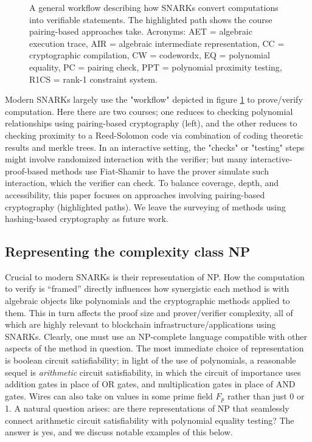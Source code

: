 \begin{figure}[htbp]
    \caption{A general workflow describing how SNARKs convert computations into verifiable statements. The highlighted path shows the course pairing-based approaches take. Acronyms: AET = algebraic execution trace, AIR = algebraic intermediate representation, CC = cryptographic compilation, CW = codewordx, EQ = polynomial equality, PC = pairing check, PPT = polynomial proximity testing, R1CS = rank-1 constraint system.}
    \label{fig:snark-workflow}
\end{figure}
Modern SNARKs largely use the "workflow" depicted in figure \ref{fig:snark-workflow} to prove/verify computation. Here there are two courses; one reduces to checking polynomial relationships using pairing-based cryptography (left), and the other reduces to checking proximity to a Reed-Solomon code via combination of coding theoretic results and merkle trees. In an interactive setting, the "checks" or "testing" steps might involve randomized interaction with the verifier; but many interactive-proof-based methods use Fiat-Shamir to have the prover simulate such interaction, which the verifier can check. To balance coverage, depth, and accessibility, this paper focuses on approaches involving pairing-based cryptography (highlighted paths). We leave the surveying of methods using hashing-based cryptography as future work.

\subsection{Representing the complexity class NP}
\noindent Crucial to modern SNARKs is their representation of NP. How the computation to verify is ``framed'' directly influences how synergistic each method is with algebraic objects like polynomials and the cryptographic methods applied to them. This in turn affects the proof size and prover/verifier complexity, all of which are highly relevant to blockchain infrastructure/applications using SNARKs. Clearly, one must use an NP-complete language compatible with other aspects of the method in question. The most immediate choice of representation is boolean circuit satisfiability; in light of the use of polynomials, a reasonable sequel is \textit{arithmetic} circuit satisfiability, in which the circuit of importance uses addition gates in place of OR gates, and multiplication gates in place of AND gates. Wires can also take on values in some prime field $F_p$  rather than just 0 or 1. A natural question arises: are there representations of NP that seamlessly connect arithmetic circuit satisfiability with polynomial equality testing? The answer is yes, and we discuss notable examples of this below.

